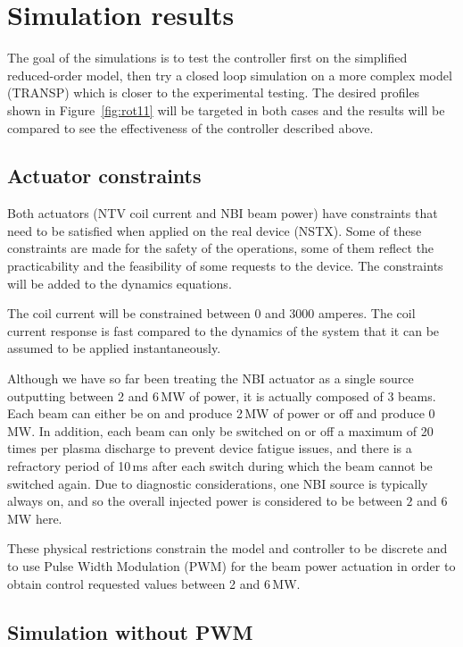 \documentclass{iopart}
\begin{document}
\section{Simulation results} 
\label{sec:sim_results}
The goal of the simulations is to test the controller first on the simplified reduced-order model, then try a closed loop simulation on a more complex model (TRANSP) which is closer to the experimental testing.  The desired profiles shown in Figure~\ref{fig:rot11} will be targeted in both cases and the results will be compared to see the effectiveness of the controller described above.

\subsection{Actuator constraints}
\label{constraints}

Both actuators (NTV coil current and NBI beam power) have constraints that need to be satisfied when applied on the real device (NSTX). Some of these constraints are made for the safety of the operations, some of them reflect the practicability and the feasibility of some requests to the device. The constraints will be added to the dynamics equations.

The coil current will be constrained between 0 and 3000 amperes.
The coil current response is fast compared to the dynamics of the system that it can be assumed to be applied instantaneously.

Although we have so far been treating the NBI actuator as a single source outputting between 2 and 6\,MW of power, it is actually composed of 3 beams. Each beam can either be on and produce 2\,MW of power or off and produce 0\,MW.
In addition, each beam can only be switched on or off a maximum of 20 times per plasma discharge to prevent device fatigue issues, and there is a refractory period of 10\,ms after each switch during which the beam cannot be switched again.
Due to diagnostic considerations, one NBI source is typically always on, and so the overall injected power is considered to be between $2$ and $6$ MW here.

These physical restrictions constrain the model and controller to be discrete and to use Pulse Width Modulation (PWM) for the beam power actuation in order to obtain control requested values between 2 and 6\,MW.


\subsection{Simulation without PWM}
\label{noPWM}
\end{document}
